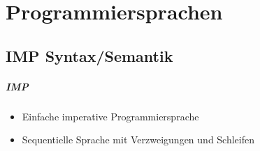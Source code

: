 \documentclass[a4paper, 11pt, accentcolor = tud3b]{tudreport}
\begin{document}
    \chapter{Programmiersprachen}
	    \section{IMP Syntax/Semantik}
		    \paragraph{IMP}
			    \begin{itemize}
			    	\item Einfache imperative Programmiersprache
			    	\item Sequentielle Sprache mit Verzweigungen und Schleifen
			    \end{itemize}
		    
\end{document}
